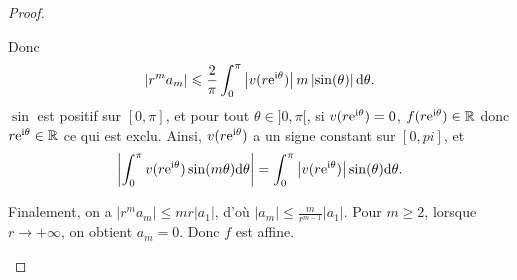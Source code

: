 \documentclass[12pt]{article}
\begin{document}
\begin{proof}
\begin{enumerate}
        Donc 
        \begin{equation}
            \left\lvert r^{m}a_m\right\rvert\leqslant\frac{2}{\pi}\int_{0}^{\pi}\left\lvert v(r\mathrm{e}^{\mathrm{i}\theta})\right\rvert m\left\lvert \sin(\theta)\right\rvert\mathrm{d}\theta.
        \end{equation}
        $\sin$ est positif sur $[0,\pi]$, et pour tout $\theta\in]0,\pi[$, si $v(r\mathrm{e}^{\mathrm{i}\theta})=0$, $f(r\mathrm{e}^{\mathrm{i}\theta})\in\mathbb{R}$ donc $r\mathrm{e}^{\mathrm{i}\theta}\in\mathbb{R}$ ce qui est exclu. Ainsi, $v(r\mathrm{e}^{\mathrm{i}\theta})$ a un signe constant sur $[0,pi]$, et 
        \begin{equation}
            \left\lvert\int_{0}^{\pi}v(r\mathrm{e}^{\mathrm{i}\theta})\sin(m\theta)\mathrm{d}\theta\right\rvert=\int_{0}^{\pi}\left\lvert v(r\mathrm{e}^{\mathrm{i}\theta})\right\rvert\sin(\theta)\mathrm{d}\theta.
        \end{equation}

        Finalement, on a $\left\lvert r^{m}a_m\right\rvert\leqslant mr\left\lvert a_1\right\rvert$, d'où $\left\lvert a_m\right\rvert\leqslant\frac{m}{r^{m-1}}\left\lvert a_1\right\vert$. Pour $m\geqslant2$, lorsque $r\to+\infty$, on obtient $a_m=0$. Donc $f$ est affine.
    \end{enumerate}
\end{proof}
\end{document}
